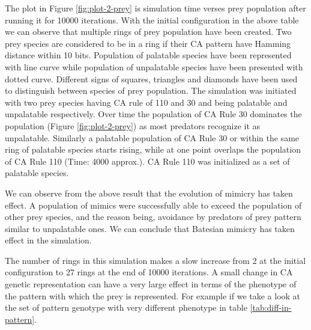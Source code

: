 \documentclass[letterpaper]{article}
\numberwithin{equation}{section}
\begin{document}
The plot in Figure \ref{fig:plot-2-prey} is simulation time verses prey population after running it for 10000 iterations. With the initial configuration in the above table we can observe that multiple rings of prey population have been created. Two prey species are considered to be in a ring if their CA pattern have Hamming distance within 10 bits. Population of palatable species have been represented with line curve while population of unpalatable species have been presented with dotted curve. Different signs of squares, triangles and diamonds have been used to distinguish between species of prey population. The simulation was initiated with two prey species having CA rule of 110 and 30 and being palatable and unpalatable respectively. Over time the population of CA Rule 30 dominates the population (Figure \ref{fig:plot-2-prey}) as most predators recognize it as unpalatable. Similarly a palatable population of CA Rule 30 or within the same ring of palatable species starts rising, while at one point overlaps the population of CA Rule 110 (Time: 4000 approx.). CA Rule 110 was initialized as a set of palatable species.

We can observe from the above result that the evolution of mimicry has taken effect. A population of mimics were successfully able to exceed the population of other prey species, and the reason being, avoidance by predators of prey pattern similar to unpalatable ones. We can conclude that Batesian mimicry has taken effect in the simulation.

The number of rings in this simulation makes a slow increase from 2 at the initial configuration to 27 rings at the end of 10000 iterations. A small change in CA genetic representation can have a very large effect in terms of the phenotype of the pattern with which the prey is represented. For example if we take a look at the set of pattern genotype with very different phenotype in table \ref{tab:diff-in-pattern}.
\end{document}
